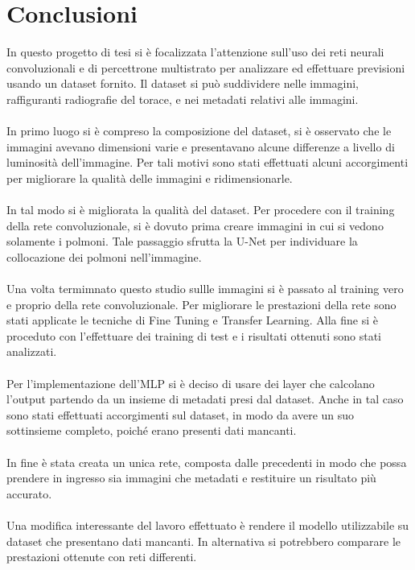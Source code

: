 \chapter*{Conclusioni}
In questo progetto di tesi si è focalizzata l'attenzione sull'uso dei reti neurali convoluzionali e di percettrone multistrato per analizzare ed effettuare 
previsioni usando un dataset fornito.
Il dataset si può suddividere nelle immagini, raffiguranti radiografie del torace, e nei metadati relativi alle immagini.
\\\\
In primo luogo si è compreso la composizione del dataset, si è osservato che le immagini avevano dimensioni varie e presentavano alcune differenze a livello 
di luminosità dell'immagine. Per tali motivi sono stati effettuati alcuni accorgimenti per migliorare la qualità delle immagini e ridimensionarle.
\\\\
In tal modo si è migliorata la qualità del dataset. Per procedere con il training della rete convoluzionale, si è dovuto prima creare immagini in cui si vedono solamente i polmoni.
Tale passaggio sfrutta la U-Net per individuare la collocazione dei polmoni nell'immagine.
\\\\
Una volta termimnato questo studio sullle immagini si è passato al training vero e proprio della rete convoluzionale.
Per migliorare le prestazioni della rete sono stati applicate le tecniche di Fine Tuning e Transfer Learning.
Alla fine si è proceduto con l'effettuare dei training di test e i risultati ottenuti sono stati analizzati.
\\\\
Per l'implementazione dell'MLP si è deciso di usare dei layer che calcolano l'output partendo da un insieme di metadati presi dal dataset.
Anche in tal caso sono stati effettuati accorgimenti sul dataset, in modo da avere un suo sottinsieme completo, poiché erano presenti dati mancanti.
\\\\
In fine è stata creata un unica rete, composta dalle precedenti in modo che possa prendere in ingresso sia immagini che metadati e restituire un risultato più accurato.
\\\\
Una modifica interessante del lavoro effettuato è rendere il modello utilizzabile su dataset che presentano dati mancanti.
In alternativa si potrebbero comparare le prestazioni ottenute con reti differenti.